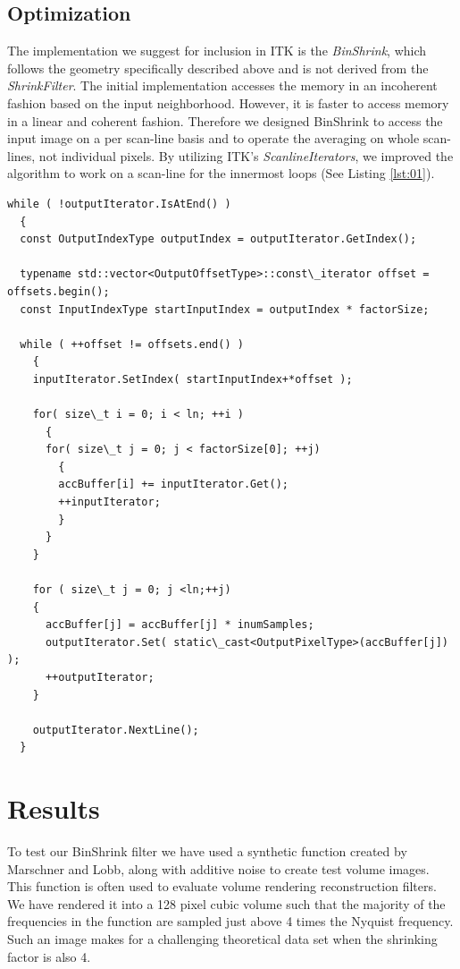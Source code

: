 \documentclass{InsightArticle}
\begin{document}
\subsection{Optimization}

The implementation we suggest for inclusion in ITK is the
\textit{BinShrink}, which follows the geometry specifically described
above and is not derived from the \textit{ShrinkFilter}. The initial
implementation accesses the memory in an incoherent fashion based on
the input neighborhood. However, it is faster to access memory in a
linear and coherent fashion. Therefore we designed BinShrink
to access the input image on a per scan-line basis and to operate the
averaging on whole scan-lines, not individual pixels. By utilizing ITK's
\textit{ScanlineIterators}, we improved the algorithm to work on a
scan-line for the innermost loops (See Listing \ref{lst:01}).

\begin{lstlisting}[label=lst:02, caption={A selection of code from the
  \textit{BinShrink} filter demonstrating scan-line averaging.}]
while ( !outputIterator.IsAtEnd() )
  {
  const OutputIndexType outputIndex = outputIterator.GetIndex();

  typename std::vector<OutputOffsetType>::const\_iterator offset = offsets.begin();
  const InputIndexType startInputIndex = outputIndex * factorSize;

  while ( ++offset != offsets.end() )
    {
    inputIterator.SetIndex( startInputIndex+*offset );

    for( size\_t i = 0; i < ln; ++i )
      {
      for( size\_t j = 0; j < factorSize[0]; ++j)
        {
        accBuffer[i] += inputIterator.Get();
        ++inputIterator;
        }
      }
    }

    for ( size\_t j = 0; j <ln;++j)
    {
      accBuffer[j] = accBuffer[j] * inumSamples;
      outputIterator.Set( static\_cast<OutputPixelType>(accBuffer[j]) );
      ++outputIterator;
    }

    outputIterator.NextLine();
  }
\end{lstlisting}

\section{Results}

To test our BinShrink filter we have used a synthetic function
created by Marschner and Lobb\cite{MarschnerL94}, along with additive
noise to create test volume images. This function is often used to
evaluate volume rendering reconstruction filters. We have rendered it
into a 128 pixel cubic volume such that the majority of the frequencies in
the function are sampled just above 4 times the Nyquist frequency. Such an image
makes for a challenging theoretical data set when the shrinking factor is also
4.
\end{document}
